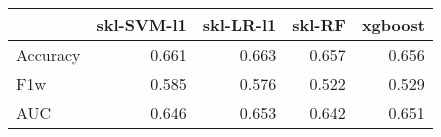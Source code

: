 \begin{tabular}{lrrrr}
\toprule
{} &  skl-SVM-l1 &  skl-LR-l1 &  skl-RF &  xgboost \\
\midrule
Accuracy &       0.661 &      0.663 &   0.657 &    0.656 \\
F1w      &       0.585 &      0.576 &   0.522 &    0.529 \\
AUC      &       0.646 &      0.653 &   0.642 &    0.651 \\
\bottomrule
\end{tabular}
